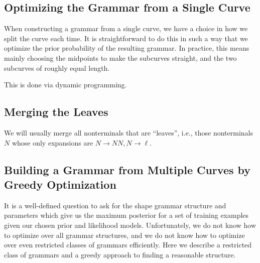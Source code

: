 \documentclass{article}
\begin{document}






\subsection{Optimizing the Grammar from a Single Curve}

When constructing a grammar from a single curve, we have a choice in
how we split the curve each time. It is straightforward to do this in
such a way that we optimize the prior probability of the resulting
grammar. In practice, this means mainly choosing the midpoints to make
the subcurves straight, and the two subcurves of roughly equal length.


This is done via dynamic programming.


\subsection{Merging the Leaves}
We will usually merge all nonterminals that are ``leaves'', i.e.,
those nonterminals $N$ whose only expansions are $N\to NN, N\to \ell$.

\subsection{Building a Grammar from Multiple Curves by Greedy Optimization}

It is a well-defined question to ask for the shape grammar structure
and parameters which give us the maximum posterior for a set of
training examples given our chosen prior and likelihood
models. Unfortunately, we do not know how to optimize over all grammar
structures, and we do not know how to optimize over even restricted
classes of grammars efficiently. Here we describe a restricted class
of grammars and a greedy approach to finding a reasonable structure.
\end{document}
